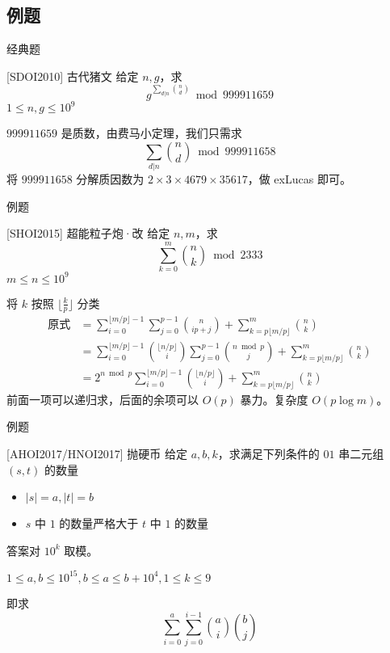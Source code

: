 \documentclass[UTF8]{beamer}
\begin{document}
    \subsection{例题}
    \begin{frame}{经典题}
        \begin{block}{[SDOI2010] 古代猪文}
            给定 $n,g$，求
            $$
            g^{\sum_{d|n}\binom{n}{d}}\bmod 999911659
            $$
            $1\le n,g\le 10^9$
        \end{block}
        \pause

        $999911659$ 是质数，由费马小定理，我们只需求
        $$
        \sum_{d|n}\binom{n}{d}\bmod 999911658
        $$
        将 $999911658$ 分解质因数为 $2\times 3\times 4679\times 35617$，做 exLucas 即可。
    \end{frame}

    \begin{frame}{例题}
        \begin{block}{[SHOI2015] 超能粒子炮·改}
            给定 $n,m$，求
            $$
            \sum_{k=0}^{m}\binom{n}{k}\bmod 2333
            $$
            $m\le n\le 10^9$
        \end{block}
    \end{frame}

    \begin{frame}
        
        将 $k$ 按照 $\lfloor \frac{k}{p} \rfloor$ 分类
        $$
        \begin{aligned}
        \text{原式} &= \sum_{i=0}^{\lfloor m/p \rfloor -1}\sum_{j=0}^{p-1}\binom{n}{ip+j}+\sum_{k=p\lfloor m/p \rfloor}^{m}\binom{n}{k}\\
            &=\sum_{i=0}^{\lfloor m/p \rfloor -1}\binom{\lfloor n/p\rfloor}{i}\sum_{j=0}^{p-1}\binom{n\bmod p}{j}+\sum_{k=p\lfloor m/p \rfloor}^{m}\binom{n}{k}\\
            &=2^{n\bmod p}\sum_{i=0}^{\lfloor m/p \rfloor -1}\binom{\lfloor n/p\rfloor}{i}+\sum_{k=p\lfloor m/p \rfloor}^{m}\binom{n}{k}
        \end{aligned}
        $$
        前面一项可以递归求，后面的余项可以 $O(p)$ 暴力。复杂度 $O(p\log m)$。
    \end{frame}

    \begin{frame}{例题}
        \begin{block}{[AHOI2017/HNOI2017] 抛硬币}
            给定 $a,b,k$，求满足下列条件的 $01$ 串二元组 $(s,t)$ 的数量
            \begin{itemize}
                \item $|s|=a,|t|=b$
                \item $s$ 中 $1$ 的数量严格大于 $t$ 中 $1$ 的数量
            \end{itemize}
            答案对 $10^k$ 取模。

            $1\le a,b\le 10^{15},b\le a\le b+10^4,1\le k\le 9$
        \end{block}
        \pause

        即求
        $$
        \sum_{i=0}^a\sum_{j=0}^{i-1}\binom{a}{i}\binom{b}{j}
        $$
    \end{frame}
\end{document}
